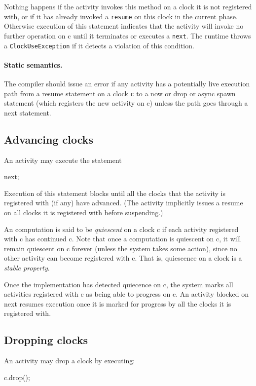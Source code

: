Nothing happens if the activity invokes this method on a clock it is
not registered with, or if it has already invoked a {\tt resume} on
this clock in the current phase.  Otherwise execution of this
statement indicates that the activity will invoke no further operation
on {\cf c} until it terminates or executes a {\tt next}. The runtime
throws a {\tt ClockUseException} if it detects a violation of this
condition.

\paragraph{Static semantics.} 
The compiler should issue an error if any activity has a potentially
live execution path from a {\cf resume} statement on a clock {\tt c}
to a {\cf now} or {\cf drop} or async spawn statement (which registers
the new activity on {\cf c}) unless the path goes through a {\cf next}
statement.

\subsection{Advancing clocks}
An activity may execute the statement
\begin{x10}
  next;
\end{x10}

\noindent 
Execution of this statement blocks until all the clocks that the
activity is registered with (if any) have advanced. (The activity
implicitly issues a {\cf resume} on all clocks it is registered
with before suspending.)

An \Xten{} computation is said to be {\em quiescent} on a clock {\cf
c} if each activity registered with {\cf c} has continued {\cf c}.
Note that once a computation is quiescent on {\cf c}, it will remain
quiescent on {\cf c} forever (unless the system takes some action),
since no other activity can become registered with {\cf c}.  That is,
quiescence on a clock is a {\em stable property}.

Once the implementation has detected quiecence on {\cf c}, the system
marks all activities registered with {\cf c} as being able to progress
on {\cf c}. An activity blocked on {\cf next} resumes execution once
it is marked for progress by all the clocks it is registered with.

\subsection{Dropping clocks}
An activity may drop a clock by executing:
\begin{x10}
c.drop();
\end{x10}

